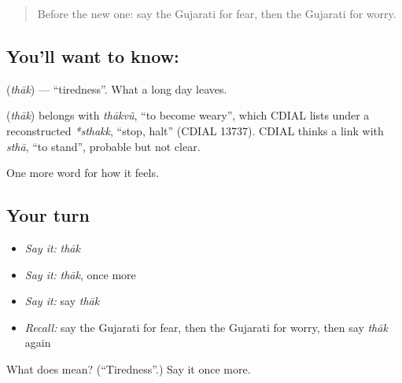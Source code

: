 \begin{quote}
Before the new one: say the Gujarati for fear, then the Gujarati for worry.
\end{quote}

\subsection*{You'll want to know: }
\textbf{} (\emph{thāk}) — \textquotedblleft{}tiredness\textquotedblright{}. What a long day leaves.

\begin{cousinweb}
\textbf{} (\emph{thāk}) belongs with \emph{thākvũ}, \textquotedblleft{}to become weary\textquotedblright{}, which CDIAL lists under a reconstructed \emph{*sthakk}, \textquotedblleft{}stop, halt\textquotedblright{} (CDIAL 13737). CDIAL thinks a link with \emph{sthā}, \textquotedblleft{}to stand\textquotedblright{}, probable but not clear.
\end{cousinweb}

\begin{grammarlens}[title={What you've built}]
One more word for how it feels.
\end{grammarlens}

\subsection*{Your turn}
\begin{itemize}
\raggedright
  \item \emph{Say it:} \emph{thāk}
  \item \emph{Say it:} \emph{thāk}, once more
  \item \emph{Say it:} say \emph{thāk}
  \item \emph{Recall:} say the Gujarati for fear, then the Gujarati for worry, then say \emph{thāk} again
\end{itemize}

\begin{tcolorbox}[breakable,colback=teal!4,colframe=teal!35!black,title={Before you move on}]
What does  mean? (\textquotedblleft{}Tiredness\textquotedblright{}.) Say it once more.
\end{tcolorbox}
